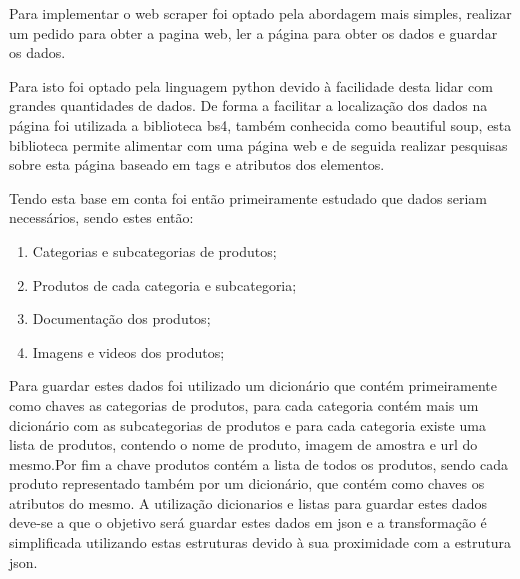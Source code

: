 Para implementar o web scraper foi optado pela abordagem mais simples, realizar um pedido para obter a
pagina web, ler a página para obter os dados e guardar os dados.

Para isto foi optado pela linguagem python devido à facilidade desta lidar com grandes quantidades 
de dados. De forma a facilitar a localização dos dados na página foi utilizada a biblioteca bs4, também
conhecida como beautiful soup, esta biblioteca permite alimentar com uma página web e de seguida realizar
pesquisas sobre esta página baseado em tags e atributos dos elementos.

Tendo esta base em conta foi então primeiramente estudado que dados seriam necessários, sendo estes então:
\begin{enumerate}
    \item Categorias e subcategorias de produtos;
    \item Produtos de cada categoria e subcategoria;
    \item Documentação dos produtos;
    \item Imagens e videos dos produtos;
\end{enumerate}

\newpage

Para guardar estes dados foi utilizado um dicionário que contém primeiramente como chaves as categorias de produtos,
para cada categoria contém mais um dicionário com as subcategorias de produtos e para cada categoria existe uma lista
de produtos, contendo o nome de produto, imagem de amostra e url do mesmo.Por fim a chave produtos contém a lista de 
todos os produtos, sendo cada produto representado também por um dicionário, que contém como chaves os atributos do mesmo.
A utilização dicionarios e listas para guardar estes dados deve-se a que o objetivo será guardar estes dados 
em json e a transformação é simplificada utilizando estas estruturas devido à sua proximidade com a estrutura
json.

